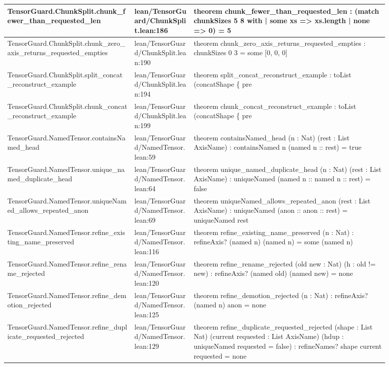 \documentclass[10pt]{article}
\begin{document}
\begin{longtable}{|p{0.30\linewidth}|p{0.14\linewidth}|p{0.46\linewidth}|}
\hline
TensorGuard.ChunkSplit.chunk\_fewer\_than\_requested\_len & lean/TensorGuard/ChunkSplit.lean:186 & theorem chunk\_fewer\_than\_requested\_len : (match chunkSizes 5 8 with | some xs => xs.length | none => 0) = 5 \\
\hline
TensorGuard.ChunkSplit.chunk\_zero\_axis\_returns\_requested\_empties & lean/TensorGuard/ChunkSplit.lean:190 & theorem chunk\_zero\_axis\_returns\_requested\_empties : chunkSizes 0 3 = some [0, 0, 0] \\
\hline
TensorGuard.ChunkSplit.split\_concat\_reconstruct\_example & lean/TensorGuard/ChunkSplit.lean:194 & theorem split\_concat\_reconstruct\_example : toList (concatShape \{ pre \\
\hline
TensorGuard.ChunkSplit.chunk\_concat\_reconstruct\_example & lean/TensorGuard/ChunkSplit.lean:199 & theorem chunk\_concat\_reconstruct\_example : toList (concatShape \{ pre \\
\hline
TensorGuard.NamedTensor.containsNamed\_head & lean/TensorGuard/NamedTensor.lean:59 & theorem containsNamed\_head (n : Nat) (rest : List AxisName) : containsNamed n (named n :: rest) = true \\
\hline
TensorGuard.NamedTensor.unique\_named\_duplicate\_head & lean/TensorGuard/NamedTensor.lean:64 & theorem unique\_named\_duplicate\_head (n : Nat) (rest : List AxisName) : uniqueNamed (named n :: named n :: rest) = false \\
\hline
TensorGuard.NamedTensor.uniqueNamed\_allows\_repeated\_anon & lean/TensorGuard/NamedTensor.lean:69 & theorem uniqueNamed\_allows\_repeated\_anon (rest : List AxisName) : uniqueNamed (anon :: anon :: rest) = uniqueNamed rest \\
\hline
TensorGuard.NamedTensor.refine\_existing\_name\_preserved & lean/TensorGuard/NamedTensor.lean:116 & theorem refine\_existing\_name\_preserved (n : Nat) : refineAxis? (named n) (named n) = some (named n) \\
\hline
TensorGuard.NamedTensor.refine\_rename\_rejected & lean/TensorGuard/NamedTensor.lean:120 & theorem refine\_rename\_rejected (old new : Nat) (h : old != new) : refineAxis? (named old) (named new) = none \\
\hline
TensorGuard.NamedTensor.refine\_demotion\_rejected & lean/TensorGuard/NamedTensor.lean:125 & theorem refine\_demotion\_rejected (n : Nat) : refineAxis? (named n) anon = none \\
\hline
TensorGuard.NamedTensor.refine\_duplicate\_requested\_rejected & lean/TensorGuard/NamedTensor.lean:129 & theorem refine\_duplicate\_requested\_rejected (shape : List Nat) (current requested : List AxisName) (hdup : uniqueNamed requested = false) : refineNames? shape current requested = none \\

\end{longtable}
\end{document}
